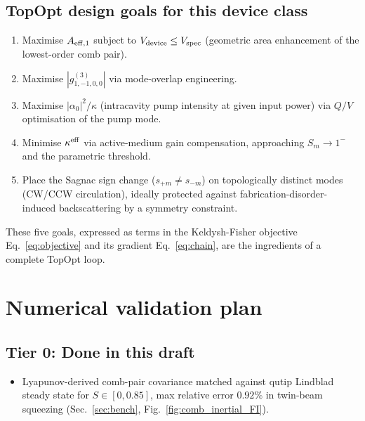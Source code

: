 \documentclass[11pt]{article}
\newcommand{\eff}{{\rm eff}}
\begin{document}
\subsection{TopOpt design goals for this device class}

\begin{enumerate}\itemsep0em
\item Maximise $A_{\eff,1}$ subject to $V_{\rm device}\leq V_{\rm spec}$
  (geometric area enhancement of the lowest-order comb pair).
\item Maximise $|g^{(3)}_{1,-1,0,0}|$ via mode-overlap engineering.
\item Maximise $|\alpha_0|^2/\kappa$ (intracavity pump intensity at
  given input power) via $Q/V$ optimisation of the pump mode.
\item Minimise $\kappa^\eff$ via active-medium gain compensation,
  approaching $S_m\to 1^-$ and the parametric threshold.
\item Place the Sagnac sign change ($s_{+m}\neq s_{-m}$) on
  topologically distinct modes (CW/CCW circulation), ideally
  protected against fabrication-disorder-induced backscattering by a
  symmetry constraint.
\end{enumerate}

These five goals, expressed as terms in the Keldysh-Fisher objective
Eq.~\eqref{eq:objective} and its gradient Eq.~\eqref{eq:chain}, are
the ingredients of a complete TopOpt loop.

\section{Numerical validation plan}
\label{sec:validation}

\subsection{Tier 0: Done in this draft}
\begin{itemize}\itemsep0em
\item Lyapunov-derived comb-pair covariance matched against qutip
  Lindblad steady state for $S\in[0,0.85]$, max relative error
  $0.92\%$ in twin-beam squeezing
  (Sec.~\ref{sec:bench}, Fig.~\ref{fig:comb_inertial_FI}).
\end{itemize}
\end{document}
